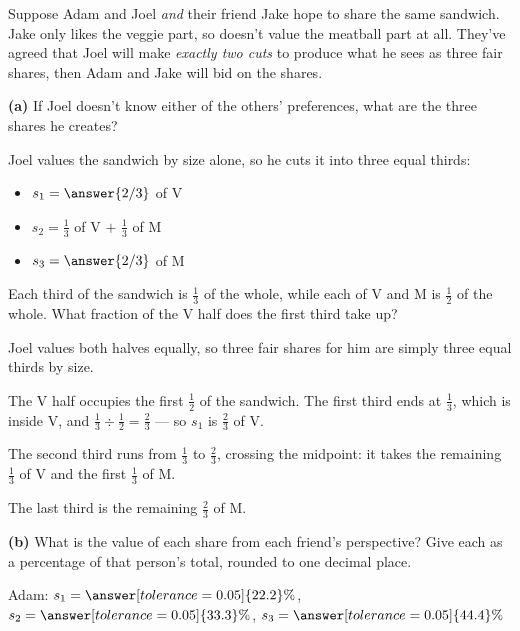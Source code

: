 \documentclass[12pt]{ximera}
\begin{document}
\begin{problem}
Suppose Adam and Joel \emph{and} their friend Jake hope to share the same sandwich.
Jake only likes the veggie part, so doesn't value the meatball part at all. They've
agreed that Joel will make \emph{exactly two cuts} to produce what he sees as three
fair shares, then Adam and Jake will bid on the shares.

\begin{prompt}
\textbf{(a)} If Joel doesn't know either of the others' preferences, what are the three
shares he creates?

Joel values the sandwich by size alone, so he cuts it into three equal thirds:
\begin{itemize}
\item $s_1 = \answer{2/3}$ of V
\item $s_2 = \frac13$ of V $+$ $\frac13$ of M
\item $s_3 = \answer{2/3}$ of M
\end{itemize}

\begin{hint}
Each third of the sandwich is $\frac13$ of the whole, while each of V and M is
$\frac12$ of the whole. What fraction of the V half does the first third take up?
\end{hint}

\begin{solution}
Joel values both halves equally, so three fair shares for him are simply three equal
thirds by size.

The V half occupies the first $\frac12$ of the sandwich. The first third ends at
$\frac13$, which is inside V, and $\frac13 \div \frac12 = \frac23$ --- so
$s_1$ is $\frac23$ of V.

The second third runs from $\frac13$ to $\frac23$, crossing the midpoint: it takes the
remaining $\frac13$ of V and the first $\frac13$ of M.

The last third is the remaining $\frac23$ of M.
\end{solution}
\end{prompt}

\begin{prompt}
\textbf{(b)} What is the value of each share from each friend's perspective? Give each
as a percentage of that person's total, rounded to one decimal place.

Adam: $s_1 = \answer[tolerance=0.05]{22.2}\%$, \quad
$s_2 = \answer[tolerance=0.05]{33.3}\%$, \quad
$s_3 = \answer[tolerance=0.05]{44.4}\%$


\end{prompt}
\end{problem}
\end{document}
